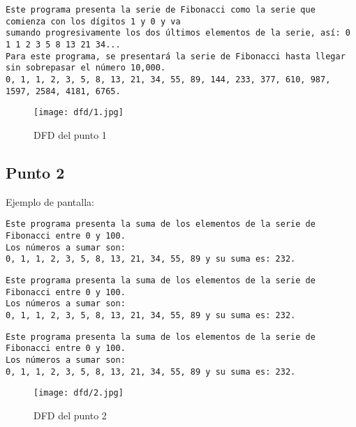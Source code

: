 \begin{lstlisting}
Este programa presenta la serie de Fibonacci como la serie que comienza con los dígitos 1 y 0 y va
sumando progresivamente los dos últimos elementos de la serie, así: 0 1 1 2 3 5 8 13 21 34...
Para este programa, se presentará la serie de Fibonacci hasta llegar sin sobrepasar el número 10,000.
0, 1, 1, 2, 3, 5, 8, 13, 21, 34, 55, 89, 144, 233, 377, 610, 987, 1597, 2584, 4181, 6765.
\end{lstlisting}

\begin{figure}
  \centering
  \texttt{[image: dfd/1.jpg]}
  \caption{ DFD del punto 1}
  \label{fig: DFD del punto 1}
\end{figure}




\subsection{Punto 2}
	
	Ejemplo de pantalla:
\begin{lstlisting}
Este programa presenta la suma de los elementos de la serie de Fibonacci entre 0 y 100.
Los números a sumar son: 
0, 1, 1, 2, 3, 5, 8, 13, 21, 34, 55, 89 y su suma es: 232.
\end{lstlisting}

\begin{lstlisting}
Este programa presenta la suma de los elementos de la serie de Fibonacci entre 0 y 100.
Los números a sumar son: 
0, 1, 1, 2, 3, 5, 8, 13, 21, 34, 55, 89 y su suma es: 232.
\end{lstlisting}

\begin{lstlisting}
Este programa presenta la suma de los elementos de la serie de Fibonacci entre 0 y 100.
Los números a sumar son: 
0, 1, 1, 2, 3, 5, 8, 13, 21, 34, 55, 89 y su suma es: 232.
\end{lstlisting}

\begin{figure}
  \centering
  \texttt{[image: dfd/2.jpg]}
  \caption{ DFD del punto 2}
  \label{fig: DFD del punto 2}
\end{figure}


